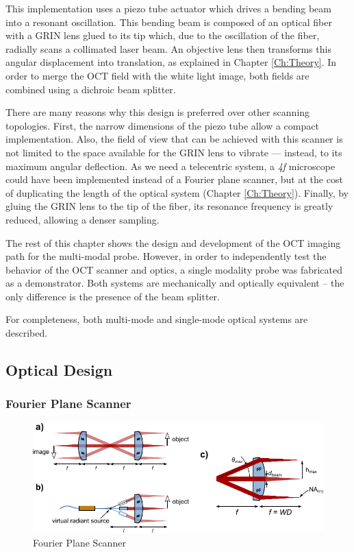 This implementation uses a piezo tube actuator which drives a bending beam into a resonant oscillation. This bending beam is composed of an optical fiber with a GRIN lens glued to its tip which, due to the oscillation of the fiber, radially scans a collimated laser beam. An objective lens then transforms this angular displacement into translation, as explained in Chapter \ref{Ch:Theory}. In order to merge the OCT field with the white light image, both fields are combined using a dichroic beam splitter.

There are many reasons why this design is preferred over other scanning topologies. First, the narrow dimensions of the piezo tube allow a compact implementation. Also, the field of view that can be achieved with this scanner is not limited to the space available for the GRIN lens to vibrate --- instead, to its maximum angular deflection. As we need a telecentric system, a \textit{4f} microscope could have been implemented instead of a Fourier plane scanner, but at the cost of duplicating the length of the optical system (Chapter \ref{Ch:Theory}). Finally, by gluing the GRIN lens to the tip of the fiber, its resonance frequency is greatly reduced, allowing a denser sampling.


The rest of this chapter shows the design and development of the OCT imaging path for the multi-modal probe. However, in order to independently test the behavior of the OCT scanner and optics, a single modality probe was fabricated as a demonstrator. Both systems are mechanically and optically equivalent -- the only difference is the presence of the beam splitter. 

For completeness, both multi-mode and single-mode optical systems are described.



\newpage
\subsection{Optical Design}

\subsubsection*{Fourier Plane Scanner}



\begin{figure}[h!]\centering \includegraphics{figures/30_DesignSimulation/fps2.pdf}
      \caption{Fourier Plane Scanner}
\end{figure}

